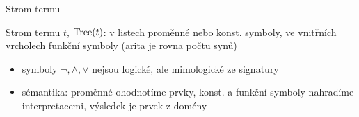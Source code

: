 \documentclass{beamer}
\begin{document}
\begin{frame}{Strom termu}
    
    \alert{Strom termu} $t$, \alert{$\operatorname{Tree}(t)$}: v listech proměnné nebo konst. symboly, ve vnitřních vrcholech funkční symboly (arita je rovna počtu synů)

    \begin{center}

    \end{center}

    \begin{itemize}
        \item symboly $\neg,\land,\lor$ nejsou logické, ale mimologické ze signatury
        \item \alert{sémantika}: proměnné ohodnotíme prvky, konst. a funkční symboly nahradíme interpretacemi, výsledek je prvek z domény
    \end{itemize}
    
\end{frame}
\end{document}
